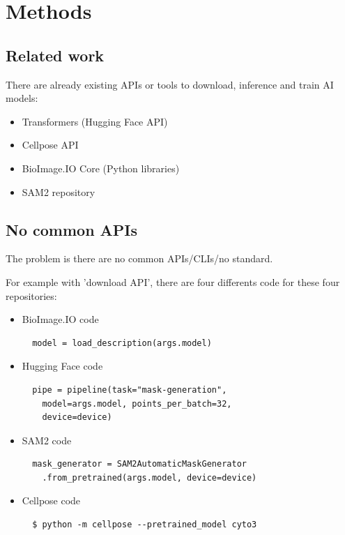 \section{Methods}
\label{sec:methods}

\subsection{Related work}

There are already existing APIs or tools to download, inference and train AI
models:
\begin{itemize}
  \item Transformers (Hugging Face API) \cite{wolf-etal-2020-transformers}
  \item Cellpose API \cite{Stringer2020.02.02.931238}
  \item BioImage.IO Core (Python libraries)
  \item SAM2 repository \cite{ravi2024sam2}
\end{itemize}

\subsection{No common APIs}

The problem is there are no common APIs/\Gls{CLI}s/no standard.

For example with 'download API', there are four differents code for these four
repositories:
\begin{itemize}

  \item BioImage.IO code
  \begin{verbatim}
  model = load_description(args.model)
  \end{verbatim}

  \item Hugging Face code
  \begin{verbatim}
  pipe = pipeline(task="mask-generation",
    model=args.model, points_per_batch=32,
    device=device)
  \end{verbatim}

  \item SAM2 code
  \begin{verbatim}
  mask_generator = SAM2AutomaticMaskGenerator
    .from_pretrained(args.model, device=device)
  \end{verbatim}

  \item Cellpose code
  \begin{verbatim}
  $ python -m cellpose --pretrained_model cyto3
  \end{verbatim}
\end{itemize}

